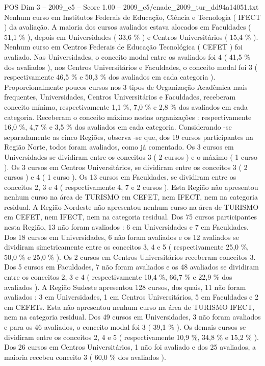 \begin{textsample}{POS Dim 3 – 2009\_c5 – Score 1.00 – 2009\_c5/enade\_2009\_tur\_dd94a14051.txt}
Nenhum curso em Institutos Federais de Educação, Ciência e Tecnologia ( IFECT ) da avaliação.
A maioria dos cursos avaliados estava alocados em Faculdades ( 51,1 \% ), depois em Universidades ( 33,6 \% ) e Centros Universitários ( 15,4 \% ).
Nenhum curso em Centros Federais de Educação Tecnológica ( CEFET ) foi avaliado.
Nas Universidades, o conceito modal entre os avaliados foi 4 ( 41,5 \% dos avaliados ), nos Centros Universitários e Faculdades, o conceito modal foi 3 ( respectivamente 46,5 \% e 50,3 \% dos avaliados em cada categoria ).
Proporcionalmente poucos cursos nos 3 tipos de Organização Acadêmica mais frequentes, Universidades, Centros Universitários e Faculdades, receberam conceito mínimo, respectivamente 1,1 \%, 7,0 \% e 2,8 \% dos avaliados em cada categoria.
Receberam o conceito máximo nestas organizações : respectivamente 16,0 \%, 4,7 \% e 3,5 \% dos avaliados em cada categoria.
Considerando -se separadamente as cinco Regiões, observa -se que, dos 19 cursos participantes na Região Norte, todos foram avaliados, como já comentado.
Os 3 cursos em Universidades se dividiram entre os conceitos 3 ( 2 cursos ) e o máximo ( 1 curso ).
Os 3 cursos em Centros Universitários, se dividiram entre os conceitos 3 ( 2 cursos ) e 4 ( 1 curso ).
Os 13 cursos em Faculdades, se dividiram entre os conceitos 2, 3 e 4 ( respectivamente 4, 7 e 2 cursos ).
Esta Região não apresentou nenhum curso na área de TURISMO em CEFET, nem IFECT, nem na categoria residual.
A Região Nordeste não apresentou nenhum curso na área de TURISMO em CEFET, nem IFECT, nem na categoria residual.
Dos 75 cursos participantes nesta Região, 13 não foram avaliados : 6 em Universidades e 7 em Faculdades.
Dos 18 cursos em Universidades, 6 não foram avaliados e os 12 avaliados se dividiram simetricamente entre os conceitos 3, 4 e 5 ( respectivamente 25,0 \%, 50,0 \% e 25,0 \% ).
Os 2 cursos em Centros Universitários receberam conceitos 3.
Dos 5 cursos em Faculdades, 7 não foram avaliados e os 48 avaliados se dividiram entre os conceitos 2, 3 e 4 ( respectivamente 10,4 \%, 66,7 \% e 22,9 \% dos avaliados ).
A Região Sudeste apresentou 128 cursos, dos quais, 11 não foram avaliados : 3 em Universidades, 1 em Centros Universitários, 5 em Faculdades e 2 em CEFETs.
Esta não apresentou nenhum curso na área de TURISMO IFECT, nem na categoria residual.
Dos 49 cursos em Universidades, 3 não foram avaliados e para os 46 avaliados, o conceito modal foi 3 ( 39,1 \% ).
Os demais cursos se dividiram entre os conceitos 2, 4 e 5 ( respectivamente 10,9 \%, 34,8 \% e 15,2 \% ).
Dos 26 cursos em Centros Universitários, 1 não foi avaliado e dos 25 avaliados, a maioria recebeu conceito 3 ( 60,0 \% dos avaliados ).

\end{textsample}
